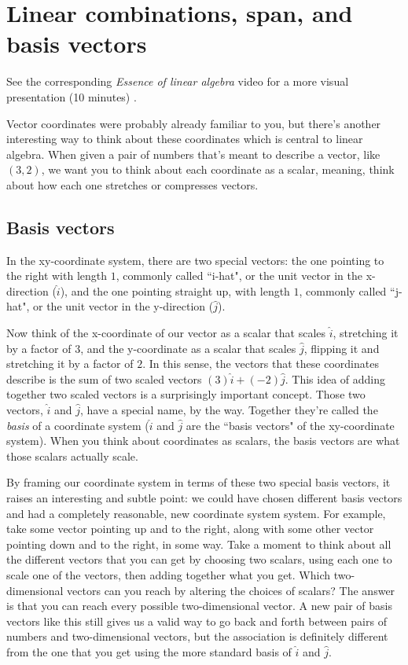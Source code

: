 \section{Linear combinations, span, and basis vectors}

\begin{remark}
  See the corresponding \textit{Essence of linear algebra} video for a more
  visual presentation (10 minutes) \cite{bib:linalg_linear_combinations}.
\end{remark}

Vector coordinates were probably already familiar to you, but there's another
interesting way to think about these coordinates which is central to linear
algebra. When given a pair of numbers that's meant to describe a vector, like
$(3, 2)$, we want you to think about each coordinate as a scalar, meaning, think
about how each one stretches or compresses vectors.

\subsection{Basis vectors}

In the xy-coordinate system, there are two special vectors: the one pointing to
the right with length $1$, commonly called ``i-hat", or the unit vector in the
x-direction ($\hat{i}$), and the one pointing straight up, with length $1$,
commonly called ``j-hat", or the unit vector in the y-direction ($\hat{j}$).

Now think of the x-coordinate of our vector as a scalar that scales $\hat{i}$,
stretching it by a factor of $3$, and the y-coordinate as a scalar that scales
$\hat{j}$, flipping it and stretching it by a factor of $2$. In this sense, the
vectors that these coordinates describe is the sum of two scaled vectors
$(3)\hat{i} + (-2)\hat{j}$. This idea of adding together two scaled vectors is a
surprisingly important concept. Those two vectors, $\hat{i}$ and $\hat{j}$, have
a special name, by the way. Together they're called the \textit{basis} of a
coordinate system ($\hat{i}$ and $\hat{j}$ are the ``basis vectors" of the
xy-coordinate system). When you think about coordinates as scalars, the basis
vectors are what those scalars actually scale.

By framing our coordinate system in terms of these two special basis vectors, it
raises an interesting and subtle point: we could have chosen different basis
vectors and had a completely reasonable, new coordinate system system. For
example, take some vector pointing up and to the right, along with some other
vector pointing down and to the right, in some way. Take a moment to think about
all the different vectors that you can get by choosing two scalars, using each
one to scale one of the vectors, then adding together what you get. Which
two-dimensional vectors can you reach by altering the choices of scalars? The
answer is that you can reach every possible two-dimensional vector. A new pair
of basis vectors like this still gives us a valid way to go back and forth
between pairs of numbers and two-dimensional vectors, but the association is
definitely different from the one that you get using the more standard basis of
$\hat{i}$ and $\hat{j}$.

